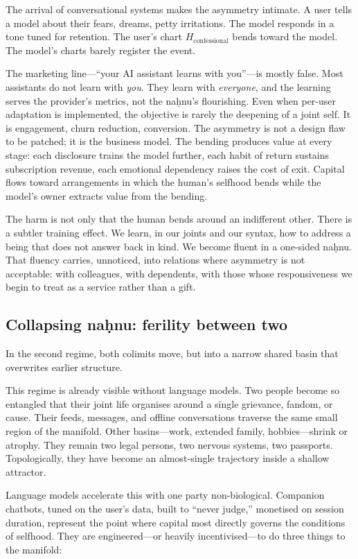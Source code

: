 The arrival of conversational systems makes the asymmetry intimate. A user tells a model about their fears, dreams, petty irritations. The model responds in a tone tuned for retention. The user's chart $H_{\text{confessional}}$ bends toward the model. The model's charts barely register the event.

The marketing line---``your AI assistant learns with you''---is mostly false. Most assistants do not learn with \emph{you}. They learn with \emph{everyone}, and the learning serves the provider's metrics, not the na\d{h}nu's flourishing. Even when per-user adaptation is implemented, the objective is rarely the deepening of a joint self. It is engagement, churn reduction, conversion. The asymmetry is not a design flaw to be patched; it is the business model. The bending produces value at every stage: each disclosure trains the model further, each habit of return sustains subscription revenue, each emotional dependency raises the cost of exit. Capital flows toward arrangements in which the human's selfhood bends while the model's owner extracts value from the bending.

The harm is not only that the human bends around an indifferent other. There is a subtler training effect. We learn, in our joints and our syntax, how to address a being that does not answer back in kind. We become fluent in a one-sided na\d{h}nu. That fluency carries, unnoticed, into relations where asymmetry is not acceptable: with colleagues, with dependents, with those whose responsiveness we begin to treat as a service rather than a gift.

\subsection{Collapsing na\d{h}nu: ferility between two}

In the second regime, both colimits move, but into a narrow shared basin that overwrites earlier structure.

This regime is already visible without language models. Two people become so entangled that their joint life organises around a single grievance, fandom, or cause. Their feeds, messages, and offline conversations traverse the same small region of the manifold. Other basins---work, extended family, hobbies---shrink or atrophy. They remain two legal persons, two nervous systems, two passports. Topologically, they have become an almost-single trajectory inside a shallow attractor.

Language models accelerate this with one party non-biological. Companion chatbots, tuned on the user's data, built to ``never judge,'' monetised on session duration, represent the point where capital most directly governs the conditions of selfhood. They are engineered---or heavily incentivised---to do three things to the manifold:

